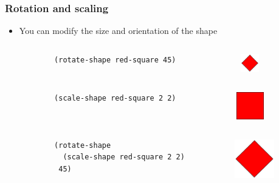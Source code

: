 \documentclass{beamer}
\begin{document}
\begin{frame}[fragile]
	\frametitle{Rotation and scaling}
	\begin{itemize}
	\item You can modify the size and orientation of the shape
	\begin{columns}[t]
		\begin{column}{.45\textwidth}
		\begin{verbatim}
		(rotate-shape red-square 45)
		\end{verbatim}
		\end{column}
		\begin{column}{.3\textwidth}
		\begin{figure}[h]
			\includegraphics[width=0.8cm]{PresentationImages/red-rectangle-rotate.png}
			\end{figure}		
		\end{column}
		\end{columns} 
		\begin{columns}[t]
		\begin{column}{.45\textwidth}
		\begin{verbatim}
		(scale-shape red-square 2 2)
		\end{verbatim}
		\end{column}
		\begin{column}{.3\textwidth}
		\begin{figure}[h]
			\includegraphics[width=1.2cm]{PresentationImages/red-rectangle-scale.png}
			\end{figure}		
		\end{column}
		\end{columns} 
		\begin{columns}[t]
		\begin{column}{.45\textwidth}
		\begin{verbatim}
		(rotate-shape 
		  (scale-shape red-square 2 2)
		 45)

		\end{verbatim}
		\end{column}
		\begin{column}{.3\textwidth}
		\begin{figure}[h]
			\includegraphics[width=1.7cm]{PresentationImages/red-rectangle-scale-rotate.png}
			\end{figure}		
		\end{column}
		\end{columns}
	\end{itemize}
\end{frame}
\end{document}
